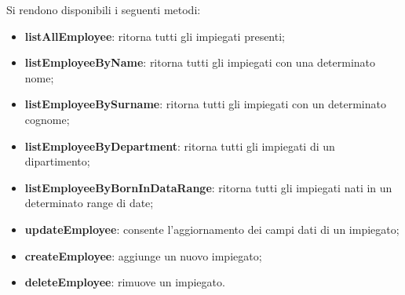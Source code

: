 Si rendono disponibili i seguenti metodi:
\begin{itemize}
  \item \textbf{listAllEmployee}: ritorna tutti gli impiegati presenti;
  \item \textbf{listEmployeeByName}: ritorna tutti gli impiegati con una determinato nome;
  \item \textbf{listEmployeeBySurname}: ritorna tutti gli impiegati con un determinato cognome;
  \item \textbf{listEmployeeByDepartment}: ritorna tutti gli impiegati di un dipartimento;
  \item \textbf{listEmployeeByBornInDataRange}: ritorna tutti gli impiegati nati in un determinato range di date;
  \item \textbf{updateEmployee}: consente l'aggiornamento dei campi dati di un impiegato;
  \item \textbf{createEmployee}: aggiunge un nuovo impiegato;
  \item \textbf{deleteEmployee}: rimuove un impiegato.
\end{itemize}
